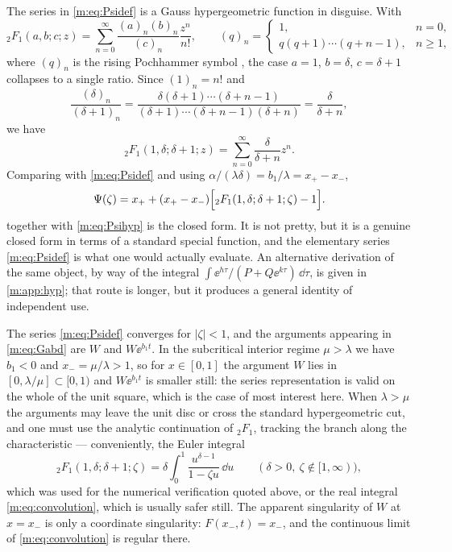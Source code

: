 The series in \cref{m:eq:Psidef} is a Gauss hypergeometric function in disguise. With
\begin{equation}
\label{m:eq:2F1def}
{}_2F_1(a,b;c;z) = \sum_{n=0}^{\infty}\frac{(a)_n(b)_n}{(c)_n}\frac{z^n}{n!},
\qquad
(q)_n = \begin{cases}1, & n=0,\\ q(q+1)\cdots(q+n-1), & n\ge1,\end{cases}
\end{equation}
where $(q)_n$ is the rising Pochhammer symbol \cite{Olver2010}, the case $a=1$,
$b=\delta$, $c=\delta+1$ collapses to a single ratio. Since $(1)_n = n!$ and
\begin{equation}
\label{m:eq:pochcancel}
\frac{(\delta)_n}{(\delta+1)_n}
= \frac{\delta(\delta+1)\cdots(\delta+n-1)}{(\delta+1)\cdots(\delta+n-1)(\delta+n)}
= \frac{\delta}{\delta+n},
\end{equation}
we have
\begin{equation}
\label{m:eq:2F1simple}
{}_2F_1(1,\delta;\delta+1;z) = \sum_{n=0}^{\infty}\frac{\delta}{\delta+n}z^n .
\end{equation}
Comparing with \cref{m:eq:Psidef} and using
$\alpha/(\lambda\delta) = b_1/\lambda = x_+-x_-$,
\begin{equation}
\label{m:eq:Psihyp}
\Psi(\zeta) = x_+ + (x_+-x_-)\Bigl[{}_2F_1(1,\delta;\delta+1;\zeta)-1\Bigr] .
\end{equation}
 together with \cref{m:eq:Psihyp} is the closed form. It is not
pretty, but it is a genuine closed form in terms of a standard special function,
and the elementary series \cref{m:eq:Psidef} is what one would actually evaluate.
An alternative derivation of the same object, by way of the integral
$\int\ee^{h\tau}/(P+Q\ee^{k\tau})\,\dd\tau$, is given in \cref{m:app:hyp}; that
route is longer, but it produces a general identity of independent use.

\begin{remark}
\label{m:rem:domain}
The series \cref{m:eq:Psidef} converges for $|\zeta|<1$, and the arguments appearing
in \cref{m:eq:Gabd} are $W$ and $W\ee^{b_1t}$. In the subcritical interior regime
$\mu>\lambda$ we have $b_1<0$ and $x_- = \mu/\lambda>1$, so for $x\in[0,1]$ the
argument $W$ lies in $[0,\lambda/\mu]\subset[0,1)$ and $W\ee^{b_1t}$ is smaller
still: the series representation is valid on the whole of the unit square, which is
the case of most interest here. When $\lambda>\mu$ the arguments may leave the unit
disc or cross the standard hypergeometric cut, and one must use the analytic
continuation of ${}_2F_1$, tracking the branch along the characteristic ---
conveniently, the Euler integral
\begin{equation*}
{}_2F_1(1,\delta;\delta+1;\zeta) = \delta\int_0^1\frac{u^{\delta-1}}{1-\zeta u}\,\dd u
\qquad(\delta>0,\ \zeta\notin[1,\infty)),
\end{equation*}
which was used for the numerical verification quoted above, or the real integral
\cref{m:eq:convolution}, which is usually safer still. The apparent singularity of
$W$ at $x=x_-$ is only a coordinate singularity: $F(x_-,t)=x_-$, and the continuous
limit of \cref{m:eq:convolution} is regular there.
\end{remark}

